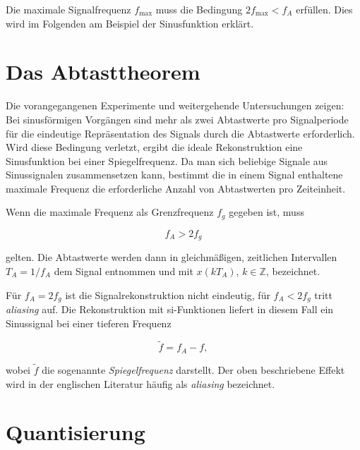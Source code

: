 Die maximale Signalfrequenz $f_{\max}$ muss die Bedingung $2f_{\max} < f_A$ erfüllen. Dies wird im Folgenden am Beispiel der Sinusfunktion erklärt.

\section{Das Abtasttheorem}
\label{sec:abtasttheorem}

Die vorangegangenen Experimente und weitergehende Untersuchungen zeigen: Bei sinusförmigen Vorgängen sind mehr als zwei Abtastwerte pro Signalperiode für die eindeutige Repräsentation des Signals durch die Abtastwerte erforderlich. Wird diese Bedingung verletzt, ergibt die ideale Rekonstruktion eine Sinusfunktion bei einer Spiegelfrequenz. Da man sich beliebige Signale aus Sinussignalen zusammensetzen kann, bestimmt die in einem Signal enthaltene maximale Frequenz die erforderliche Anzahl von Abtastwerten pro Zeiteinheit.

\begin{satz}
Wenn die maximale Frequenz als Grenzfrequenz $f_g$ gegeben ist, muss

$$
f_A > 2f_g
$$

gelten. Die Abtastwerte werden dann in gleichmäßigen, zeitlichen Intervallen $T_A = 1/f_A$ dem Signal entnommen und mit $x(kT_A)$, $k \in \mathbb{Z}$, bezeichnet.
\end{satz}

Für $f_A = 2f_g$ ist die Signalrekonstruktion nicht eindeutig, für $f_A < 2f_g$ tritt \textit{aliasing} auf. Die Rekonstruktion mit si-Funktionen liefert in diesem Fall ein Sinussignal bei einer tieferen Frequenz

$$
\tilde{f} = f_A - f,
$$

wobei $\tilde{f}$ die sogenannte \textit{Spiegelfrequenz} darstellt. Der oben beschriebene Effekt wird in der englischen Literatur häufig als \textit{aliasing} bezeichnet.


\section{Quantisierung}
\label{sec:quantisierung}

